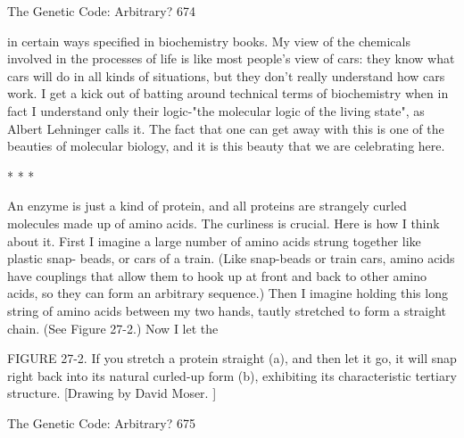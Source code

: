 The Genetic Code: Arbitrary?                                                         674

in certain ways specified in biochemistry books. My view of the chemicals involved
in the processes of life is like most people's view of cars: they know what cars will do
in all kinds of situations, but they don't really understand how cars work. I get a kick
out of batting around technical terms of biochemistry when in fact I understand only
their logic-"the molecular logic of the living state", as Albert Lehninger calls it. The
fact that one can get away with this is one of the beauties of molecular biology, and it
is this beauty that we are celebrating here.

*   *   *

         An enzyme is just a kind of protein, and all proteins are strangely curled
molecules made up of amino acids. The curliness is crucial. Here is how I think about
it. First I imagine a large number of amino acids strung together like plastic snap-
beads, or cars of a train. (Like snap-beads or train cars, amino acids have couplings
that allow them to hook up at front and back to other amino acids, so they can form an
arbitrary sequence.) Then I imagine holding this long string of amino acids between
my two hands, tautly stretched to form a straight chain. (See Figure 27-2.) Now I let
the

        FIGURE 27-2. If you stretch a protein straight (a), and then let it go, it will
snap right back into its natural curled-up form (b), exhibiting its characteristic
tertiary structure. [Drawing by David Moser. ]




The Genetic Code: Arbitrary?                                                        675


